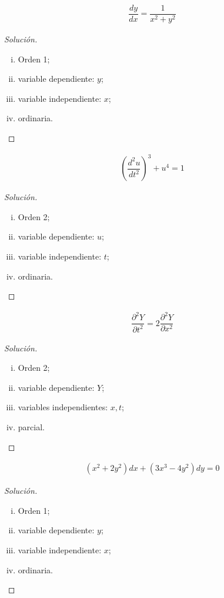 
\begin{align*}
	\dfrac{dy}{dx}= \dfrac{1}{x^{2}+y^{2}}
\end{align*}
\begin{proof}[Solución]
	\begin{enumerate}[(i)]
		\item Orden 1;
		\item variable dependiente: $ y $;
		\item variable independiente: $ x $;
		\item ordinaria.
	\end{enumerate}
\end{proof}


\begin{align*}
	\left(\dfrac{d^{2}u}{dt^{2}}\right)^{3}+u^{4}=1
\end{align*}
\begin{proof}[Solución]
	\begin{enumerate}[(i)]
		\item Orden 2;
		\item variable dependiente: $ u $;
		\item variable independiente: $ t $;
		\item ordinaria.
	\end{enumerate}
\end{proof}



\begin{align*}
	\dfrac{\partial^{2}Y}{\partial t^{2}} = 2\dfrac{\partial^{2}Y}{\partial x^{2}}
\end{align*}
\begin{proof}[Solución]
	\begin{enumerate}[(i)]
		\item Orden 2;
		\item variable dependiente: $ Y $;
		\item variables independientes: $ x,t $;
		\item parcial.
	\end{enumerate}
\end{proof}



\begin{align*}
	\left(x^{2}+2y^{2}\right)dx +\left(3x^{3}-4y^{2}\right)dy=0
\end{align*}
\begin{proof}[Solución]
	\begin{enumerate}[(i)]
		\item Orden 1;
		\item variable dependiente: $ y  $;
		\item variable independiente: $ x $;
		\item ordinaria.
	\end{enumerate}
\end{proof}

